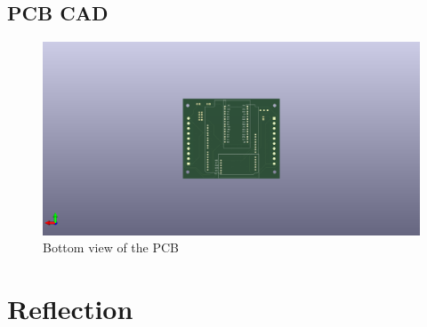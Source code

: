 \documentclass[12pt, titlepage]{article}
\begin{document}
\subsection{PCB CAD}
\begin{figure}[h!]
  \begin{center}
  \includegraphics[width=1.0\textwidth]{PCB_Back}
  \caption{Bottom view of the PCB}
  \end{center}
  \end{figure}
  \newpage



\newpage
\section{Reflection}
\end{document}
